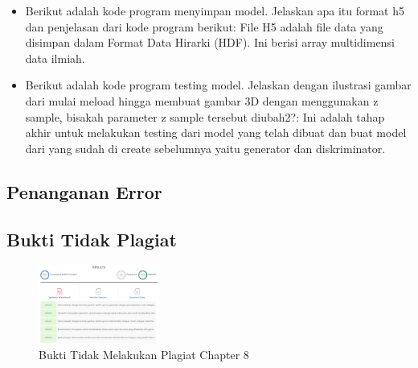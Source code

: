 \begin{enumerate}
\begin{itemize}
        	\item Berikut adalah kode program menyimpan model. Jelaskan apa itu format h5 dan penjelasan dari kode program berikut:
File H5 adalah file data yang disimpan dalam Format Data Hirarki (HDF). Ini berisi array multidimensi data ilmiah.

		

        	\item Berikut adalah kode program testing model. Jelaskan dengan ilustrasi gambar dari mulai meload hingga membuat gambar 3D dengan menggunakan z sample, bisakah parameter z sample tersebut diubah2?:
Ini adalah tahap akhir untuk melakukan testing dari model yang telah dibuat dan buat model dari yang sudah di create sebelumnya yaitu generator dan diskriminator.

		

\end{itemize}
\end{enumerate}

\subsection{Penanganan Error}
\begin{enumerate}
\begin{itemize}

\end{itemize}
\end{enumerate}

\subsection{Bukti Tidak Plagiat}
\begin{figure}[H]
\centering
	\includegraphics[width=4cm]{figures/1174008/8/bukticekplagiarismechapter8.PNG}
	\caption{Bukti Tidak Melakukan Plagiat Chapter 8}
\end{figure}
